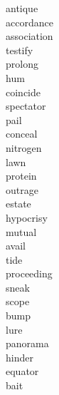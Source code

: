 \documentclass[b5paper, 11pt]{ctexart}
\begin{document}
\begin{multicols*}{3}
\begin{description}
\item[antique]

\item[accordance]

\item[association]

\item[testify]

\item[prolong]

\item[hum]

\item[coincide]

\item[spectator]

\item[pail]

\item[conceal]

\item[nitrogen]

\item[lawn]

\item[protein]

\item[outrage]

\item[estate]

\item[hypocrisy]

\item[mutual]

\item[avail]

\item[tide]

\item[proceeding]

\item[sneak]

\item[scope]

\item[bump]

\item[lure]

\item[panorama]

\item[hinder]

\item[equator]

\item[bait]


\end{description}
\end{multicols*}
\end{document}
